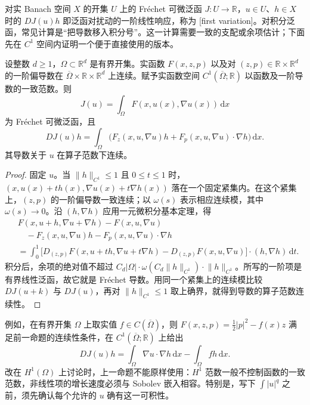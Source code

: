 对实 Banach 空间 \(X\) 的开集 \(U\) 上的 Fréchet 可微泛函 \(J:U\to\mathbb R\)，\(u\in U\)、\(h\in X\) 时的 \(DJ(u)h\) 即泛函对扰动的一阶线性响应，称为 [first variation]。对积分泛函，常见计算是“把导数移入积分号”。这一计算需要一致的支配或余项估计；下面先在 \(C^1\) 空间内证明一个便于直接使用的版本。

\begin{proposition}[光滑积分泛函的第一变分]
\label{b2:prop:14-smooth-integral-variation}
设整数 \(d\geq1\)，\(\Omega\subset\mathbb R^d\) 是有界开集。实函数 \(F(x,z,p)\) 以及对 \((z,p)\in\mathbb R\times\mathbb R^d\) 的一阶偏导数在 \(\overline\Omega\times\mathbb R\times\mathbb R^d\) 上连续。赋予实函数空间 \(C^1(\overline\Omega;\mathbb R)\) 以函数及一阶导数的一致范数。则
\[J(u)=\int_\Omega F(x,u(x),\nabla u(x))\,\mathrm dx\]
为 Fréchet 可微泛函，且
\[
 DJ(u)h=\int_\Omega\bigl(F_z(x,u,\nabla u)h+
             F_p(x,u,\nabla u)\cdot\nabla h\bigr)\,\mathrm dx.
\]
其导数关于 \(u\) 在算子范数下连续。
\end{proposition}
\begin{proof}
固定 \(u\)。当 \(\lVert h\rVert_{C^1}\le1\) 且 \(0\le t\le1\) 时，\((x,u(x)+th(x),\nabla u(x)+t\nabla h(x))\) 落在一个固定紧集内。在这个紧集上，\((z,p)\) 的一阶偏导数一致连续；以 \(\omega(s)\) 表示相应连续模，其中 \(\omega(s)\to0\)。沿 \((h,\nabla h)\) 应用一元微积分基本定理，得
\[
 \begin{split}
 &F(x,u+h,\nabla u+\nabla h)-F(x,u,\nabla u)\\
 &\quad-F_z(x,u,\nabla u)h-F_p(x,u,\nabla u)\cdot\nabla h\\
 &=\int_0^1\bigl[D_{(z,p)}F(x,u+th,\nabla u+t\nabla h)
              -D_{(z,p)}F(x,u,\nabla u)\bigr]\cdot(h,\nabla h)\,\mathrm dt.
 \end{split}
\]
积分后，余项的绝对值不超过
\(C_d|\Omega|\cdot\omega(C_d\lVert h\rVert_{C^1})\cdot\lVert h\rVert_{C^1}\)。所写的一阶项是有界线性泛函，故它就是 Fréchet 导数。用同一个紧集上的连续模比较 \(DJ(u+k)\) 与 \(DJ(u)\)，再对 \(\lVert h\rVert_{C^1}\le1\) 取上确界，就得到导数的算子范数连续性。
\end{proof}

例如，在有界开集 \(\Omega\) 上取实值 \(f\in C(\overline\Omega)\)，则 \(F(x,z,p)=\tfrac12|p|^2-f(x)z\) 满足前一命题的连续性条件，在 \(C^1(\overline\Omega;\mathbb R)\) 上给出
\[DJ(u)h=\int_\Omega\nabla u\cdot\nabla h\,\mathrm dx-\int_\Omega fh\,\mathrm dx.\]
改在 \(H^1(\Omega)\) 上讨论时，上一命题不能原样使用：\(H^1\) 范数一般不控制函数的一致范数，非线性项的增长速度必须与 Sobolev 嵌入相容。特别是，写下 \(\int |u|^q\) 之前，须先确认每个允许的 \(u\) 确有这一可积性。

